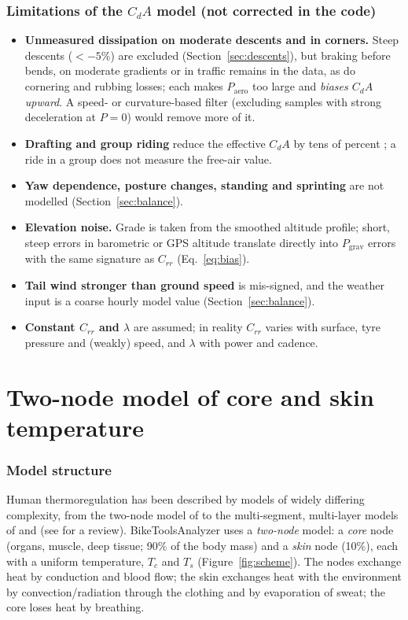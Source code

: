 \documentclass[11pt,a4paper]{article}
\newcommand{\CdA}{C_{\!d}A}
\begin{document}
\section{Limitations of the \(\CdA\) model (not corrected in the code)}
\label{sec:limits-cda}
\begin{itemize}
 \item \textbf{Unmeasured dissipation on moderate descents and in corners.} Steep descents (\(<-5\%\)) are excluded (Section~\ref{sec:descents}), but braking before bends, on moderate gradients or in traffic remains in the data, as do cornering and rubbing losses; each makes \(\hat P_{\mathrm{aero}}\) too large and \emph{biases \(\CdA\) upward}. A speed- or curvature-based filter (excluding samples with strong deceleration at \(P=0\)) would remove more of it.
 \item \textbf{Drafting and group riding} reduce the effective \(\CdA\) by tens of percent \citep{crouch2017}; a ride in a group does not measure the free-air value.
 \item \textbf{Yaw dependence, posture changes, standing and sprinting} are not modelled (Section~\ref{sec:balance}).
 \item \textbf{Elevation noise.} Grade is taken from the smoothed altitude profile; short, steep errors in barometric or GPS altitude translate directly into \(P_{\mathrm{grav}}\) errors with the same signature as \(C_{rr}\) (Eq.~\eqref{eq:bias}).
 \item \textbf{Tail wind stronger than ground speed} is mis-signed, and the weather input is a coarse hourly model value (Section~\ref{sec:balance}).
 \item \textbf{Constant \(C_{rr}\) and \(\lambda\)} are assumed; in reality \(C_{rr}\) varies with surface, tyre pressure and (weakly) speed, and \(\lambda\) with power and cadence.
\end{itemize}

\part{Two-node model of core and skin temperature}
\section{Model structure}
\label{sec:thermal-structure}
Human thermoregulation has been described by models of widely differing complexity, from the two-node model of \citet{gagge1971} to the multi-segment, multi-layer models of \citet{stolwijk1971} and \citet{fiala1999} (see \citealp{havenith2016} for a review). BikeToolsAnalyzer uses a \emph{two-node} model: a \emph{core} node (organs, muscle, deep tissue; 90\% of the body mass) and a \emph{skin} node (10\%), each with a uniform temperature, \(T_c\) and \(T_s\) (Figure~\ref{fig:scheme}). The nodes exchange heat by conduction and blood flow; the skin exchanges heat with the environment by convection/radiation through the clothing and by evaporation of sweat; the core loses heat by breathing.
\end{document}
